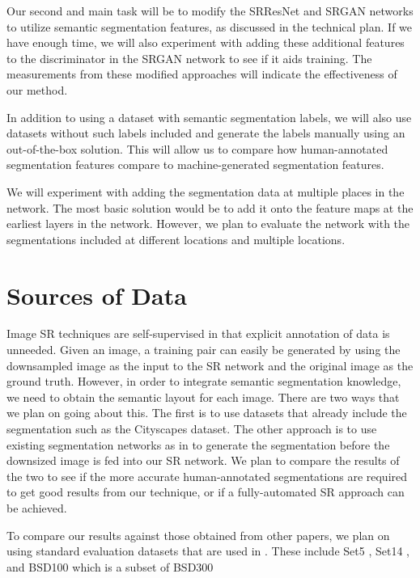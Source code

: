 \documentclass[10pt,twocolumn,letterpaper]{article}
\begin{document}
Our second and main task will be to modify the SRResNet and SRGAN networks to
utilize semantic segmentation features, as discussed in the technical plan. If
we have enough time, we will also experiment with adding these additional
features to the discriminator in the SRGAN network to see if it aids training.
The measurements from these modified approaches will indicate the effectiveness
of our method.

In addition to using a dataset with semantic segmentation labels, we will also
use datasets without such labels included and generate the labels manually
using an out-of-the-box solution. This will allow us to compare how
human-annotated segmentation features compare to machine-generated segmentation
features.

We will experiment with adding the segmentation data at multiple places in the
network. The most basic solution would be to add it onto the feature maps at
the earliest layers in the network. However, we plan to evaluate the network
with the segmentations included at different locations and multiple locations.


\section{Sources of Data}
Image SR techniques are self-supervised in that explicit annotation of data is
unneeded. Given an image, a training pair can easily be generated by using the
downsampled image as the input to the SR network and the original image as the
ground truth. However, in order to integrate semantic segmentation knowledge,
we need to obtain the semantic layout for each image. There are two ways that we
plan on going about this. The first is to use datasets that already include
the segmentation such as the Cityscapes \cite{Cityscapes} dataset. The other
approach is to use existing segmentation networks as in
\cite{FullyConvolutionalSS} to generate the segmentation before the downsized
image is fed into our SR network. We plan to compare the results of the two to
see if the more accurate human-annotated segmentations are required to get good
results from our technique, or if a fully-automated SR approach can be achieved.

To compare our results against those obtained from other papers, we plan on
using standard evaluation datasets that are used in \cite{SRGAN}. These include
Set5 \cite{Set5}, Set14 \cite{Set14}, and BSD100 which is a subset of
BSD300 \cite{BSD300}
\end{document}
